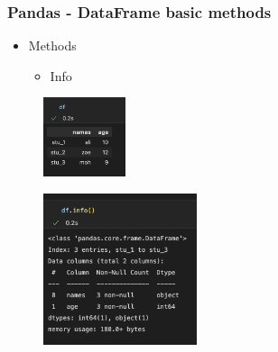 \begin{frame}\frametitle{Pandas - DataFrame basic methods}
   \begin{minipage}{0.58\linewidth}
      \begin{itemize}
         \item Methods
         \begin{itemize}
            \item Info
         \end{itemize}
      \end{itemize}
      \vspace{.5cm}
      \begin{figure}[H]
         \includegraphics[width=2.4cm]{../images/illustrations/pandas_df_ex.png}
      \end{figure}
   \end{minipage}
   \begin{minipage}{0.38\linewidth}
      \begin{figure}[H]
         \includegraphics[width=4.5cm]{../images/illustrations/pandas_info.png}
      \end{figure}
   \end{minipage}
\end{frame}

